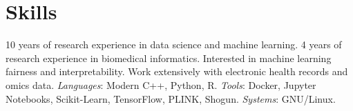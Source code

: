 \noindent \section*{Skills}
10 years of research experience in data science and machine learning. 
4 years of research experience in biomedical informatics. 
Interested in machine learning fairness and interpretability. 
Work extensively with electronic health records and omics data. 
\textit{Languages}: Modern C++, Python, R. 
\textit{Tools}: Docker, Jupyter Notebooks, Scikit-Learn, TensorFlow, PLINK, Shogun.
\textit{Systems}: GNU/Linux.  
